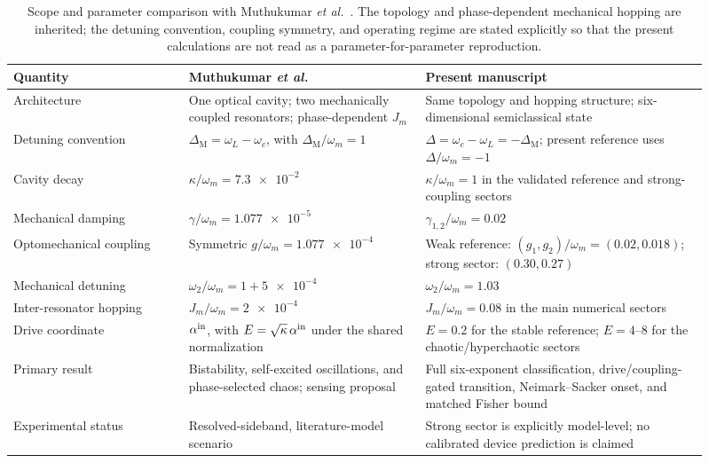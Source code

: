 \documentclass[preprint,numbers,a4paper]{elsarticle}
\begin{document}
\begin{table}[h]
  \centering
  \small
  \caption{Scope and parameter comparison with Muthukumar \emph{et al.}~\cite{muthukumar2025doi}. The topology and phase-dependent mechanical hopping are inherited; the detuning convention, coupling symmetry, and operating regime are stated explicitly so that the present calculations are not read as a parameter-for-parameter reproduction.}
  \label{SI-tab:muthukumar-comparison}
  \begin{tabular}{@{}p{0.23\linewidth}p{0.31\linewidth}p{0.37\linewidth}@{}}
    \toprule
    Quantity & Muthukumar \emph{et al.} & Present manuscript \\
    \midrule
    Architecture & One optical cavity; two mechanically coupled resonators; phase-dependent $J_m$ & Same topology and hopping structure; six-dimensional semiclassical state \\
    Detuning convention & $\Delta_{\mathrm M}=\omega_L-\omega_c$, with $\Delta_{\mathrm M}/\omega_m=1$ & $\Delta=\omega_c-\omega_L=-\Delta_{\mathrm M}$; present reference uses $\Delta/\omega_m=-1$ \\
    Cavity decay & $\kappa/\omega_m=\num{7.3e-2}$ & $\kappa/\omega_m=1$ in the validated reference and strong-coupling sectors \\
    Mechanical damping & $\gamma/\omega_m=\num{1.077e-5}$ & $\gamma_{1,2}/\omega_m=\num{0.02}$ \\
    Optomechanical coupling & Symmetric $g/\omega_m=\num{1.077e-4}$ & Weak reference: $(g_1,g_2)/\omega_m=(\num{0.02},\num{0.018})$; strong sector: $(\num{0.30},\num{0.27})$ \\
    Mechanical detuning & $\omega_2/\omega_m=1+\num{5e-4}$ & $\omega_2/\omega_m=\num{1.03}$ \\
    Inter-resonator hopping & $J_m/\omega_m=\num{2e-4}$ & $J_m/\omega_m=\num{0.08}$ in the main numerical sectors \\
    Drive coordinate & $\alpha^{\rm in}$, with $E=\sqrt{\kappa}\,\alpha^{\rm in}$ under the shared normalization & $E=\num{0.2}$ for the stable reference; $E=\num{4}$--$\num{8}$ for the chaotic/hyperchaotic sectors \\
    Primary result & Bistability, self-excited oscillations, and phase-selected chaos; sensing proposal & Full six-exponent classification, drive/coupling-gated transition, Neimark--Sacker onset, and matched Fisher bound \\
    Experimental status & Resolved-sideband, literature-model scenario & Strong sector is explicitly model-level; no calibrated device prediction is claimed \\
    \bottomrule
  \end{tabular}
\end{table}
\end{document}
